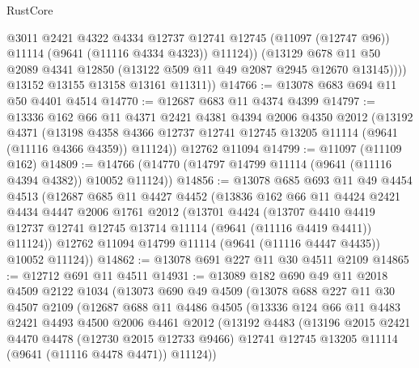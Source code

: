 \begin{lexlean}{RustCore}
\begin{coremodule}
                @3011
                @2421
                @4322
                @4334
                @12737
                @12741
                @12745
                (@11097 (@12747 @96))
                @11114
                (@9641 (@11116 @4334 @4323))
                @11124))
            (@13129
              @678
              @11
              @50
              @2089
              @4341
              @12850
              (@13122 @509 @11 @49 @2087 @2945 @12670 @13145))))
        @13152
        @13155
        @13158
        @13161
        @11311))
@14766 := @13078 @683 @694 @11 @50 @4401 @4514
@14770 := @12687 @683 @11 @4374 @4399
@14797 := @13336
    @162
    @66
    @11
    @4371
    @2421
    @4381
    @4394
    @2006
    @4350
    @2012
    (@13192
      @4371
      (@13198 @4358 @4366 @12737 @12741 @12745 @13205 @11114 (@9641 (@11116 @4366 @4359)) @11124))
    @12762
    @11094
@14799 := @11097 (@11109 @162)
@14809 := @14766 (@14770 (@14797 @14799 @11114 (@9641 (@11116 @4394 @4382)) @10052 @11124))
@14856 := @13078
    @685
    @693
    @11
    @49
    @4454
    @4513
    (@12687
      @685
      @11
      @4427
      @4452
      (@13836
        @162
        @66
        @11
        @4424
        @2421
        @4434
        @4447
        @2006
        @1761
        @2012
        (@13701
          @4424
          (@13707
            @4410
            @4419
            @12737
            @12741
            @12745
            @13714
            @11114
            (@9641 (@11116 @4419 @4411))
            @11124))
        @12762
        @11094
        @14799
        @11114
        (@9641 (@11116 @4447 @4435))
        @10052
        @11124))
@14862 := @13078 @691 @227 @11 @30 @4511 @2109
@14865 := @12712 @691 @11 @4511
@14931 := @13089
    @182
    @690
    @49
    @11
    @2018
    @4509
    @2122
    @1034
    (@13073
      @690
      @49
      @4509
      (@13078
        @688
        @227
        @11
        @30
        @4507
        @2109
        (@12687
          @688
          @11
          @4486
          @4505
          (@13336
            @124
            @66
            @11
            @4483
            @2421
            @4493
            @4500
            @2006
            @4461
            @2012
            (@13192
              @4483
              (@13196
                @2015
                @2421
                @4470
                @4478
                (@12730 @2015 @12733 @9466)
                @12741
                @12745
                @13205
                @11114
                (@9641 (@11116 @4478 @4471))
                @11124))

\end{coremodule}
\end{lexlean}
